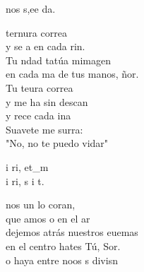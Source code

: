 \documentclass[12pt]{article}
\begin{document}
\begin{multicols*}{2}
\begin{cancion}%
	 nos s,ee da.\\
\end{cancion}%

\begin{cancion}[Tu ternura][Ixcís]%
	 ternura correa\\
	y se a en cada rin.\\
	Tu ndad tatúa mimagen\\
	en cada ma de tus manos, ñor.\\
\jump
	Tu teura correa\\
	y me ha sin descan\\
	y rece cada ina\\
	Suavete me surra:\\
	"No, no te puedo vidar"\\
\end{cancion}%

\begin{cancion}%
	i ri, et_m \\
	i ri, s i t.\\
\end{cancion}%

\begin{cancion}%
	nos un lo coran, \\
	que amos o en el ar \\
	dejemos atrás nuestros euemas\\
	en el centro hates Tú, Sor. \\
	o haya entre noos s divisn  \\
\end{cancion}%


\end{multicols*}
\end{document}
